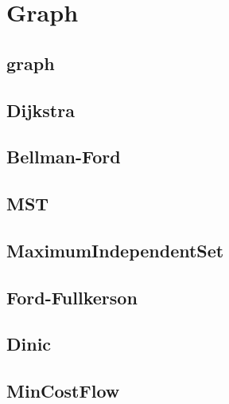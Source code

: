 \section{Graph}

\subsection{graph}


\subsection{Dijkstra}


\subsection{Bellman-Ford}


\subsection{MST}


\subsection{MaximumIndependentSet}


\subsection{Ford-Fullkerson}


\subsection{Dinic}


\subsection{MinCostFlow}


